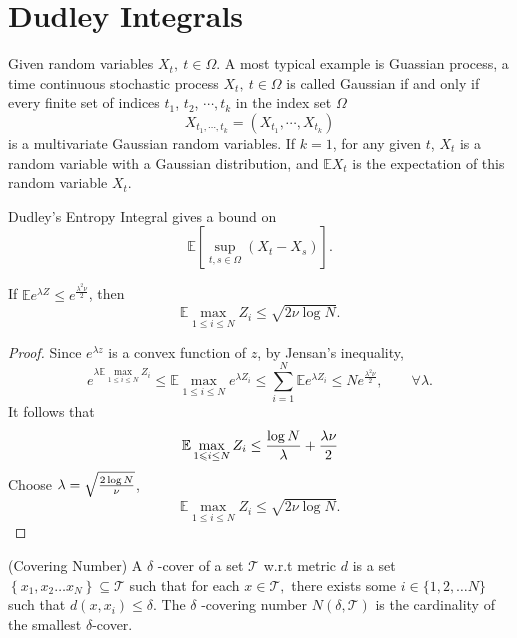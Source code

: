 \section{Dudley Integrals}

Given random variables $X_t,\ t\in \Omega$. A most typical example is Guassian process, a time continuous stochastic process $X_t,\ t\in \Omega$ is called Gaussian if and only if every finite set of indices $t_1$, $t_2$, $\cdots , t_k$ in the index set $\Omega$
$$
X_{t_1,\cdots, t_k}=(X_{t_1}, \cdots, X_{t_k})
$$
is a multivariate Gaussian random variables. If $k=1$, for any given $t$, $X_t$ is a random variable  with a Gaussian distribution, and $\mathbb{E}X_t$ is the expectation of this random variable $X_t$.



Dudley's Entropy Integral gives a bound on 
$$
\mathbb{E}\left[\sup _{t, s \in \Omega} (X_{t} - X_s)\right].
$$

\begin{lemma}\label{lm:dudley0}
If $\mathbb{E} e^{\lambda Z} \leq e^{\frac{\lambda^{2} \nu}{2}}$, then
\begin{equation}
\mathbb{E} \max_{1\le i \le N} Z_{i} \leq \sqrt{2 \nu \log N}.
\end{equation}
\end{lemma}
\begin{proof}
Since $e^{\lambda z}$ is a convex function of $z$, by Jensan's inequality,
\begin{equation}
\displaystyle 
e^{\lambda \mathbb{E}\max_{1\le i \le N} Z_{i}} \leq \mathbb{E} \max_{1\le i \le N}  e^{\lambda Z_{i}} \leq  \sum_{i=1}^{N} \mathbb{E} e^{\lambda Z_{i}} \leqslant N e^{\frac{\lambda^{2} \nu}{2}},\qquad \forall \lambda.
\end{equation}
It follows that
\begin{equation}
\mathbb{E} \max _{1 \leqslant i \leq N} Z_{i} \leq  {\log N\over \lambda}+\frac{\lambda \nu}{2}
\end{equation} 
Choose $\lambda=\sqrt{2\log N\over \nu}$,
\begin{equation}
\mathbb{E} \max _{1 \leqslant i \leq N} Z_{i} \leq  \sqrt{2\nu \log N }.
\end{equation} 
\end{proof}
 
\begin{definition} (Covering Number) A $ \delta$ -cover of a set $\mathcal{T}$ w.r.t metric $d$ is a set $\left\{x_{1}, x_{2} \ldots x_{N}\right\} \subseteq \mathcal{T}$ such that for each $x \in \mathcal{T},$ there exists some $i \in\{1,2, \ldots N\}$ such that $d\left(x, x_{i}\right) \leq \delta .$ The $\delta$ -covering number $N(\delta, \mathcal{T})$ is the cardinality of the smallest $\delta$-cover.
\end{definition}

